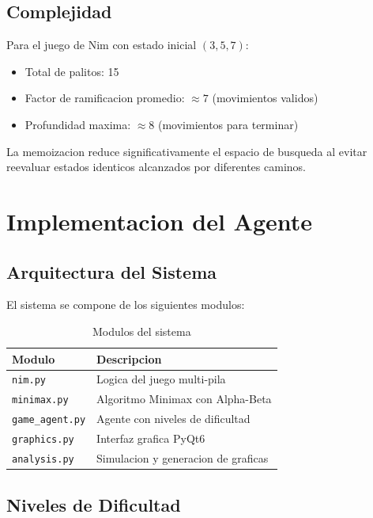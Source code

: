 \documentclass[12pt,a4paper]{article}
\theoremstyle{definition}
\begin{document}
\subsection{Complejidad}

Para el juego de Nim con estado inicial $(3, 5, 7)$:
\begin{itemize}
    \item Total de palitos: 15
    \item Factor de ramificacion promedio: $\approx 7$ (movimientos validos)
    \item Profundidad maxima: $\approx 8$ (movimientos para terminar)
\end{itemize}

La memoizacion reduce significativamente el espacio de busqueda al evitar reevaluar estados identicos alcanzados por diferentes caminos.

\section{Implementacion del Agente}

\subsection{Arquitectura del Sistema}

El sistema se compone de los siguientes modulos:

\begin{table}[H]
\centering
\caption{Modulos del sistema}
\begin{tabular}{lp{8cm}}
\toprule
\textbf{Modulo} & \textbf{Descripcion} \\
\midrule
\texttt{nim.py} & Logica del juego multi-pila \\
\texttt{minimax.py} & Algoritmo Minimax con Alpha-Beta \\
\texttt{game\_agent.py} & Agente con niveles de dificultad \\
\texttt{graphics.py} & Interfaz grafica PyQt6 \\
\texttt{analysis.py} & Simulacion y generacion de graficas \\
\bottomrule
\end{tabular}
\end{table}

\subsection{Niveles de Dificultad}
\end{document}
